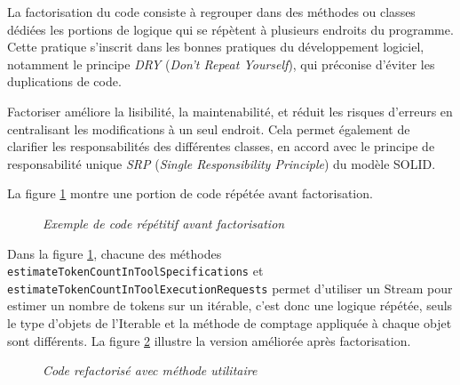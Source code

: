 \documentclass[12pt,a4paper]{report}
\begin{document}
	La factorisation du code consiste à regrouper dans des méthodes ou classes dédiées les portions de logique qui se répètent à plusieurs endroits du programme. Cette pratique s'inscrit dans les bonnes pratiques du développement logiciel, notamment le principe \textit{DRY} (\textit{Don't Repeat Yourself}), qui préconise d'éviter les duplications de code.
	
	Factoriser améliore la lisibilité, la maintenabilité, et réduit les risques d'erreurs en centralisant les modifications à un seul endroit. Cela permet également de clarifier les responsabilités des différentes classes, en accord avec le principe de responsabilité unique \textit{SRP} (\textit{Single Responsibility Principle}) du modèle SOLID.
	
	La figure \ref{fig:before-factorisation} montre une portion de code répétée avant factorisation.
	
	\begin{figure}[H]
		\centering
		\caption{\textit{Exemple de code répétitif avant factorisation}}
		\label{fig:before-factorisation}
	\end{figure}
	
	Dans la figure \ref{fig:before-factorisation}, chacune des méthodes \verb|estimateTokenCountInToolSpecifications| et \verb|estimateTokenCountInToolExecutionRequests| permet d'utiliser un Stream pour estimer un nombre de tokens sur un itérable, c'est donc une logique répétée, seuls le type d'objets de l'Iterable et la méthode de comptage appliquée à chaque objet sont différents. La figure \ref{fig:after-factorisation} illustre la version améliorée après factorisation.
	
	\begin{figure}[H]
		\centering
		\caption{\textit{Code refactorisé avec méthode utilitaire}}
		\label{fig:after-factorisation}
	\end{figure}
	
\end{document}
